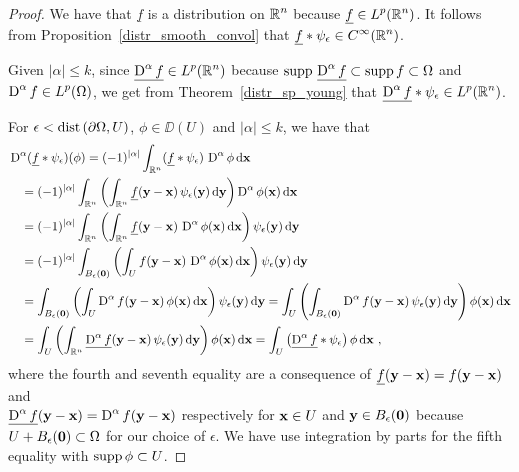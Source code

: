 \begin{proof}
We have that $\underline{f}$ is a distribution on $\displaystyle \mathbb{R}^n$ because
$\displaystyle \underline{f} \in L^p(\mathbb{R}^n)$.
It follows from Proposition~\ref{distr_smooth_convol} that 
$\displaystyle \underline{f} \ast \psi_{\epsilon} \in C^\infty(\mathbb{R}^n)$.

Given $|\alpha|\leq k$, since
$\displaystyle \underline{\operatorname{D}^\alpha f} \in L^p(\mathbb{R}^n)$ because
$\displaystyle \operatorname{supp}\, \underline{\operatorname{D}^\alpha f} \subset
\operatorname{supp} f \subset \Omega$ and
$\displaystyle \operatorname{D}^\alpha f \in L^p(\Omega)$, we get from
Theorem~\ref{distr_sp_young} that
$\displaystyle \underline{\operatorname{D}^\alpha f} \ast \psi_\epsilon \in L^p(\mathbb{R}^n)$.

For $\epsilon < \mathrm{dist}\left(\partial \Omega,U\right)$, $\phi \in \DD(U)$ and
$|\alpha|\leq k$, we have that
\begin{align*}
&\operatorname{D}^\alpha(\underline{f} \ast \psi_\epsilon)(\phi)
= (-1)^{|\alpha|} \int_{\mathbb{R}^n}
(\underline{f} \ast \psi_\epsilon)\, \operatorname{D}^\alpha \phi \,\mathrm{d}{\mathbf{x}}  \\
&\quad = (-1)^{|\alpha|} \int_{\mathbb{R}^n}
\left( \int_{\mathbb{R}^n} \underline{f}(\mathbf{y}-\mathbf{x})\,
\psi_\epsilon (\mathbf{y}) \,\mathrm{d}{\mathbf{y}} \right) \operatorname{D}^\alpha \phi(\mathbf{x})
\,\mathrm{d}{\mathbf{x}} \\
&\quad = (-1)^{|\alpha|} \int_{\mathbb{R}^n} \left( \int_{\mathbb{R}^n}
\underline{f}(\mathbf{y}-\mathbf{x})\, \operatorname{D}^\alpha \phi(\mathbf{x}) \,\mathrm{d}{\mathbf{x}}
\right) \psi_\epsilon (\mathbf{y}) \,\mathrm{d}{\mathbf{y}} \\
&\quad = (-1)^{|\alpha|} \int_{B_\epsilon(\mathbf{0})}
\left( \int_{U} f(\mathbf{y}-\mathbf{x})\,
\operatorname{D}^\alpha \phi(\mathbf{x}) \,\mathrm{d}{\mathbf{x}}
\right) \psi_\epsilon (\mathbf{y}) \,\mathrm{d}{\mathbf{y}} \\
&\quad = \int_{B_\epsilon(\mathbf{0})}
\left( \int_{U} \operatorname{D}^\alpha f(\mathbf{y}-\mathbf{x})\, \phi(\mathbf{x}) \,\mathrm{d}{\mathbf{x}}
\right) \psi_\epsilon (\mathbf{y}) \,\mathrm{d}{\mathbf{y}}
= \int_U \left( \int_{B_\epsilon(\mathbf{0})} \operatorname{D}^\alpha f (\mathbf{y}-\mathbf{x})\,
\psi_\epsilon (\mathbf{y}) \,\mathrm{d}{\mathbf{y}} \right) \phi(\mathbf{x}) \,\mathrm{d}{\mathbf{x}} \\
&\quad = \int_U \left( \int_{\mathbb{R}^n} \underline{\operatorname{D}^\alpha f}
(\mathbf{y}-\mathbf{x})\,
\psi_\epsilon (\mathbf{y}) \,\mathrm{d}{\mathbf{y}} \right) \phi(\mathbf{x}) \,\mathrm{d}{\mathbf{x}}
= \int_{U} \left( \underline{\operatorname{D}^\alpha f} \ast
\psi_\epsilon \right) \phi \,\mathrm{d}{\mathbf{x}} \ ,
\end{align*}
where the fourth and seventh equality are a consequence of
$\displaystyle \underline{f}(\mathbf{y} - \mathbf{x}) = f(\mathbf{y}-\mathbf{x})$
and\\
$\displaystyle \underline{\operatorname{D}^\alpha f}(\mathbf{y} - \mathbf{x})
= \operatorname{D}^\alpha f(\mathbf{y}-\mathbf{x})$ respectively 
for $\mathbf{x} \in U$ and $\mathbf{y} \in B_\epsilon(\mathbf{0})$ because
$U + B_\epsilon(\mathbf{0}) \subset \Omega$ for our choice of $\epsilon$.
We have use integration by parts for the fifth equality with
$\operatorname{supp} \phi \subset U$.


\end{proof}
